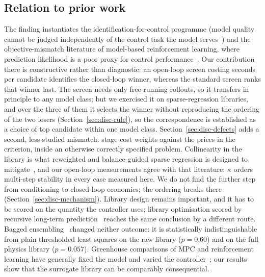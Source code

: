 \subsection{Relation to prior work}
\label{sec:disc-related}

The finding instantiates the identification-for-control programme (model quality cannot be judged independently of the control task the model serves~\cite{gevers1993,vandenhof1995,ljung1999,hjalmarsson2005,controlorientedsurvey2025}) and
the objective-mismatch literature of model-based reinforcement learning, where
prediction likelihood is a poor proxy for control
performance~\cite{lambert2020,wei2024,farahmand2017,jackson2022}. Our
contribution there is constructive rather than diagnostic: an open-loop screen
costing seconds per candidate identifies the closed-loop winner, whereas the
standard screen ranks that winner last. The screen needs only free-running
rollouts, so it transfers in principle to any model class; but we exercised it on
sparse-regression libraries, and over the three of them it selects the winner
without reproducing the ordering of the two losers
(Section~\ref{sec:disc-rule}), so the correspondence is established as a choice of
top candidate within one model class.
Section~\ref{sec:disc-defects} adds a second, less-studied mismatch: stage-cost
weights against the prices in the criterion, inside an otherwise correctly
specified problem. Collinearity in the library is what reweighted and
balance-guided sparse regression is designed to
mitigate~\cite{cortiella2021,balanceguided2026,belsley1980}, and our open-loop
measurements agree with that literature: $\kappa$ orders multi-step stability in every
case measured here. We do not find the further step from conditioning to closed-loop
economics; the ordering breaks there (Section~\ref{sec:disc-mechanism}). Library
design remains important, and it has to be scored on the quantity the controller
uses; library optimisation scored by recursive long-term
prediction~\cite{yonezawa2026} reaches the same conclusion by a different route. Bagged
ensembling~\cite{fasel2022} changed neither outcome: it is statistically
indistinguishable from plain thresholded least squares on the raw library
($p=0.60$) and on the full physics library ($p=0.057$).
Greenhouse comparisons of MPC and reinforcement learning have generally fixed the model
and varied the controller~\cite{morcego2023,mallick2025,vanlaatum2025,lin2021}; our
results show that the surrogate library can be comparably consequential.

